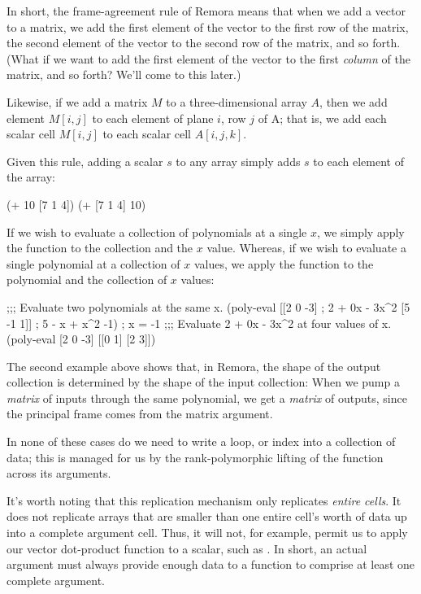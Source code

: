 In short, the frame-agreement rule of Remora means that
when we add a vector to a matrix,
we add the first element of the vector to the first row of the matrix,
the second element of the vector to the second row of the matrix,
and so forth.
(What if we want to add the first element of the vector
to the first \emph{column} of the matrix, and so forth?
We'll come to this later.)

Likewise, if we add a matrix $M$ to a three-dimensional array $A$,
then we add element $M[i,j]$ to each element of plane $i$, row $j$ of
A;
that is, we add each scalar cell $M[i,j]$ to each scalar cell $A[i,j,k]$.

Given this rule, adding a scalar $s$ to any array simply adds $s$
to each element of the array:
\begin{code}
    (+ 10 [7 1 4])
\result{[17 11 14]}
    (+ [7 1 4] 10)
\result{[17 11 14]}\end{code}

If we wish to evaluate a collection of polynomials at a single $x$,
we simply apply the  function to the collection and the $x$ value.
Whereas, if we wish to evaluate a single polynomial
at a collection of $x$ values, we apply the function to the polynomial
and the collection of $x$ values:
\begin{code}
    ;;; Evaluate two polynomials at the same x.
    (poly-eval [[2  0 -3]        ; 2 + 0x - 3x^2
                [5 -1  1]]       ; 5 -  x +  x^2
               -1)               ; x = -1
\result{[-1 7]}
    ;;; Evaluate 2 + 0x - 3x^2 at four values of x.
    (poly-eval [2 0 -3] [[0 1]
                         [2 3]])
\result{[[  2  -1]
 [-10 -25]]}\end{code}
The second example above shows that, in Remora,
the shape of the output collection is determined by
the shape of the input collection:
When we pump a \emph{matrix} of inputs through the same polynomial,
we get a \emph{matrix} of outputs,
since the principal frame comes from the matrix argument.

In none of these cases
do we need to write a loop, or index into a collection of data;
this is managed for us by the rank-polymorphic lifting of the
 function across its arguments.

It's worth noting that this replication mechanism only replicates
\emph{entire cells}.
It does not replicate arrays that are smaller than one entire cell's
worth  of data up into a complete argument cell.
Thus, it will not, for example, permit us to apply our vector
dot-product function to a scalar, such as .
In short, an actual argument must always provide enough data to
a function to comprise at least one complete argument.

